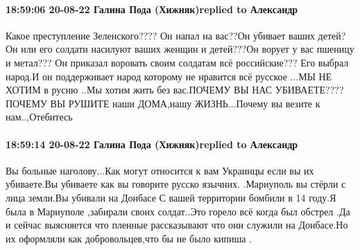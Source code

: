  
 
 
 
 

\paragraph{18:59:06 20-08-22 Галина Пода (Хижняк)replied to Александр}

Какое преступление Зеленского???? Он напал на вас??Он убивает ваших детей? Он
или его солдати насилуют ваших женщин и детей???Он ворует у вас пшеницу и
метал??? Он приказал воровать своим солдатам всё российские??? Его выбрал
народ.И он поддерживает народ которому не нравится всё русское ...МЫ НЕ ХОТИМ в
русню ..Мы хотим жить без вас.ПОЧЕМУ ВЫ НАС УБИВАЕТЕ????ПОЧЕМУ ВЫ РУШИТЕ наши
ДОМА,нашу ЖИЗНЬ...Почему вы везите к нам..,Отебитесь

\paragraph{18:59:14 20-08-22 Галина Пода (Хижняк)replied to Александр}

Вы больные наголову...Как могут относится к вам Украинцы если вы их убиваете.Вы
убиваете как вы говорите русско язычних. .Мариуполь вы стёрли с лица земли.Вы
убивали на Донбасе С вашей территории бомбили в 14 году.Я была в Мариуполе
,забирали своих солдат..Это горело всё когда был обстрел .Да и сейчас
выясняется что пленные рассказывают что они служили на Донбасе.Но их оформляли
как добровольцев,что бы не было кипиша .
